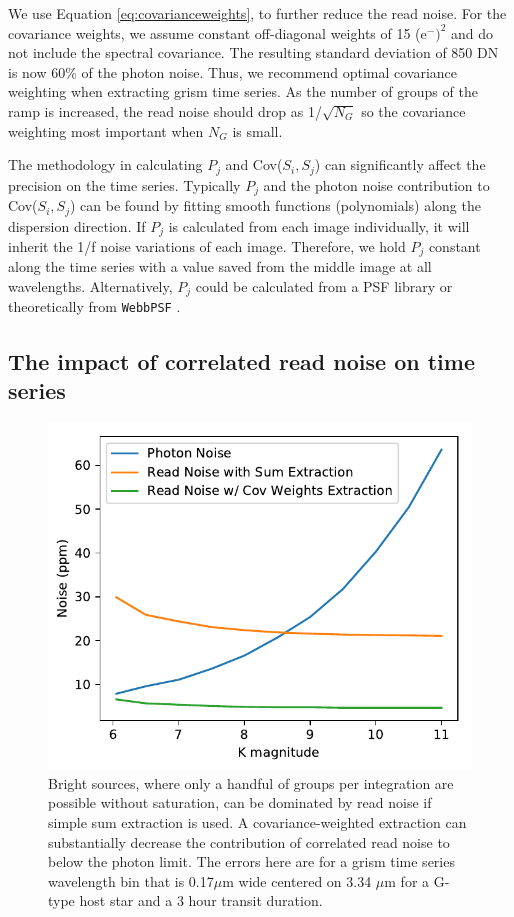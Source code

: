\documentclass[]{aastex62}
\begin{document}
We use Equation \ref{eq:covarianceweights}, to further reduce the read noise.
For the covariance weights, we assume constant off-diagonal weights of 15 (e$^-)^2$ and do not include the spectral covariance.
The resulting standard deviation of 850 DN is now 60\% of the photon noise.
Thus, we recommend optimal covariance weighting when extracting grism time series.
As the number of groups of the ramp is increased, the read noise should drop as 1/$\sqrt{N_G}$ so the covariance weighting most important when $N_G$ is small.

The methodology in calculating $P_j$ and Cov($S_i,S_j$) can significantly affect the precision on the time series.
Typically $P_j$ and the photon noise contribution to Cov($S_i,S_j$) can be found by fitting smooth functions (polynomials) along the dispersion direction.
If $P_j$ is calculated from each image individually, it will inherit the 1/f noise variations of each image.
Therefore, we hold $P_j$ constant along the time series with a value saved from the middle image at all wavelengths.
Alternatively, $P_j$ could be calculated from a PSF library or theoretically from \texttt{WebbPSF} \citep{perrin2014webbpsf}.

\subsection{The impact of correlated read noise on time series}

\begin{figure}[!hbtp]
\centering
\includegraphics[width=.49\columnwidth]{generic_src_errors.pdf}
\caption{Bright sources, where only a handful of groups per integration are possible without saturation, can be dominated by read noise if simple sum extraction is used.
A covariance-weighted extraction can substantially decrease the contribution of correlated read noise to below the photon limit.
The errors here are for a grism time series wavelength bin that is 0.17$\mu$m wide centered on 3.34 $\mu$m for a G-type host star and a 3 hour transit duration.
}\label{fig:genericSourceErrorContrib}
\end{figure}
\end{document}
